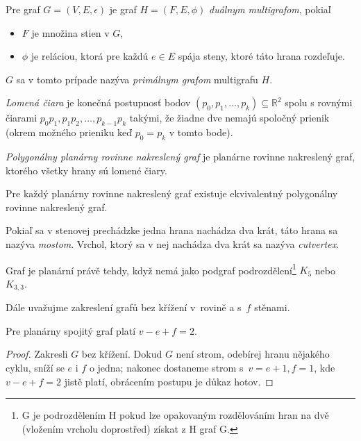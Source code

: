 \begin{definition}
	Pre graf $G=(V,E,\epsilon)$ je graf $H=(F,E,\phi)$ {\em duálnym multigrafom}, pokiaľ
	\begin{itemize}
		\item $F$ je množina stien v $G$,
		\item $\phi$ je reláciou, ktorá pre každú $e \in E$ spája steny, ktoré táto hrana rozdeľuje.
	\end{itemize}
	$G$ sa v tomto prípade nazýva {\em primálnym grafom} multigrafu $H$.
\end{definition}

\begin{definition}
	{\em Lomená čiara} je konečná postupnosť bodov $(p_0, p_1, \ldots,
	p_k) \subseteq \mathbb{R}^2$ spolu s rovnými čiarami $p_0p_1, p_1p_2, 
	\ldots, p_{k-1}p_k$ takými, že žiadne dve nemajú spoločný prienik
	(okrem možného prieniku keď $p_0=p_k$ v tomto bode).
	
	{\em Polygonálny planárny rovinne nakreslený graf} je planárne rovinne
	nakreslený graf, ktorého všetky hrany sú lomené čiary.
\end{definition}

Pre každý planárny rovinne nakreslený graf existuje ekvivalentný polygonálny
rovinne nakreslený graf.

Pokiaľ sa v stenovej prechádzke jedna hrana nachádza dva krát, táto hrana
sa nazýva {\em mostom}. Vrchol, ktorý sa v nej nachádza dva krát sa nazýva
{\em cutvertex}.

\begin{theorem}[Kuratowski]
Graf je planární právě tehdy, když nemá jako podgraf
podrozdělení\footnote{G je podrozdělením H pokud lze opakovaným
rozdělováním hran na dvě (vložením vrcholu doprostřed) získat z H graf
G.} $K_5$ nebo $K_{3,3}$.
\end{theorem}

Dále uvažujme zakreslení grafů bez křížení v~rovině a s~$f$
stěnami.

\begin{theorem}[Euler]
Pre planárny spojitý graf platí 
$v - e + f = 2$.
\end{theorem}

\begin{proof}
Zakresli $G$ bez křížení.  Dokud
$G$ není strom, odebírej hranu nějakého cyklu, sníží se $e$ i $f$ o
jedna; nakonec dostaneme strom s~$v = e + 1, f = 1$, kde $v - e + f = 2$
jistě platí, obrácením postupu je důkaz hotov.
\end{proof}

